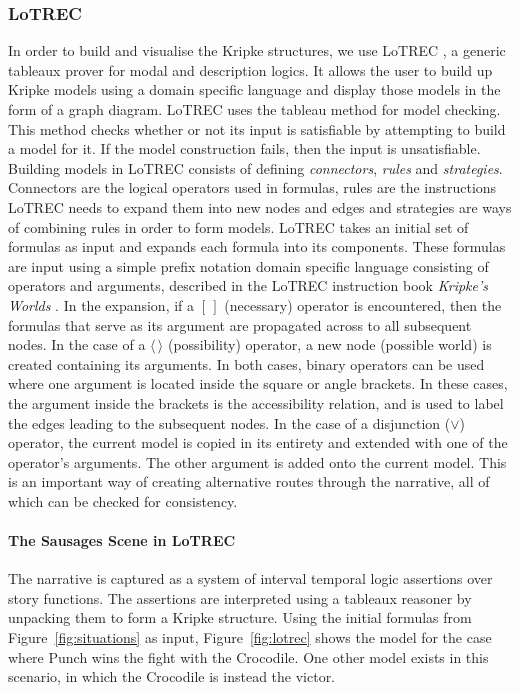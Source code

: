 \documentclass[11pt]{report}
\begin{document}
\subsubsection{LoTREC}
In order to build and visualise the Kripke structures, we use LoTREC \citep{del2001lotrec}, a generic tableaux prover for modal and description logics. It allows the user to build up Kripke models using a domain specific language and display those models in the form of a graph diagram.
LoTREC uses the tableau method for model checking. This method checks whether or not its input is satisfiable by attempting to build a model for it. If the model construction fails, then the input is unsatisfiable.
Building models in LoTREC consists of defining \emph{connectors}, \emph{rules} and \emph{strategies}. Connectors are the logical operators used in formulas, rules are the instructions LoTREC needs to expand them into new nodes and edges and strategies are ways of combining rules in order to form models.
LoTREC takes an initial set of formulas as input and expands each formula into its components. These formulas are input using a simple prefix notation domain specific language consisting of operators and arguments, described in the LoTREC instruction book \emph{Kripke's Worlds} \citep{gasquet2013kripke}.
In the expansion, if a $[\,]$ (necessary) operator is encountered, then the formulas that serve as its argument are propagated across to all subsequent nodes. In the case of a $\langle \, \rangle$ (possibility) operator, a new node (possible world) is created containing its arguments. In both cases, binary operators can be used where one argument is located inside the square or angle brackets. In these cases, the argument inside the brackets is the accessibility relation, and is used to label the edges leading to the subsequent nodes.
In the case of a disjunction ($\lor$) operator, the current model is copied in its entirety and extended with one of the operator's arguments. The other argument is added onto the current model. This is an important way of creating alternative routes through the narrative, all of which can be checked for consistency.

\paragraph{The Sausages Scene in LoTREC}
The narrative is captured as a system of interval temporal logic assertions over story functions. The  assertions are interpreted using a tableaux reasoner by unpacking them to form a Kripke structure.
Using the initial formulas from Figure~\ref{fig:situations} as input, Figure~\ref{fig:lotrec} shows the model for the case where Punch wins the fight with the Crocodile. One other model exists in this scenario, in which the Crocodile is instead the victor.
\end{document}
